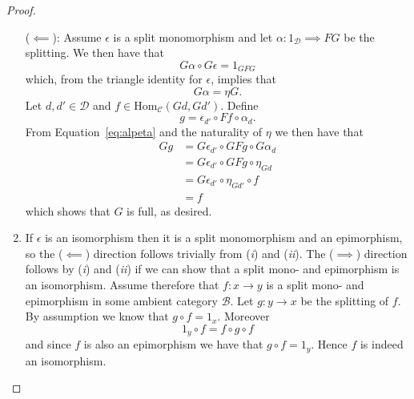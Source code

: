\begin{proof}
\begin{enumerate}[label=(\roman*)]
      \noindent ($ \impliedby $): Assume $ \epsilon $ is a split monomorphism and let $ \alpha: 1_{\mathcal{D}} \implies FG $ be the splitting. We then have that
      \begin{equation}
        G\alpha \circ G \epsilon = 1_{GFG}
      \end{equation}
      which, from the triangle identity for $ \epsilon $, implies that
      \begin{equation}
        G\alpha = \eta G.
        \label{eq:alpeta}
      \end{equation}
      Let $ d,d' \in \mathcal{D} $ and $ f \in \text{Hom}_{\mathcal{C}}(Gd, Gd') $. Define
      \begin{equation}
        g = \epsilon_{d'} \circ Ff \circ \alpha_d.
      \end{equation}
      From Equation~\ref{eq:alpeta} and the naturality of $ \eta $ we then have that
      \begin{align*}
        Gg &= G\epsilon_{d'} \circ GFg \circ G\alpha_d \\
           &= G\epsilon_{d'} \circ GFg \circ \eta_{Gd} \\
           &= G\epsilon_{d'} \circ \eta_{Gd'} \circ f \\
           &= f
      \end{align*}
      which shows that $ G $ is full, as desired.


    \item If $ \epsilon $ is an isomorphism then it is a split monomorphism and an epimorphism, so the ($ \impliedby $) direction follows trivially from (\textit{i}) and (\textit{ii}). The ($ \implies $) direction follows by (\textit{i}) and (\textit{ii}) if we can show that a split mono- and epimorphism is an isomorphism. Assume therefore that $ f: x \to y $ is a split mono- and epimorphism in some ambient category $ \mathcal{B} $. Let $ g: y \to x $ be the splitting of $ f $. By assumption we know that $ g\circ f = 1_x $. Moreover
    \begin{equation}
      1_y \circ f = f \circ g \circ f
    \end{equation}
    and since $ f $ is also an epimorphism we have that $ g\circ f = 1_y $. Hence $ f $ is indeed an isomorphism.



\end{enumerate}
\end{proof}
